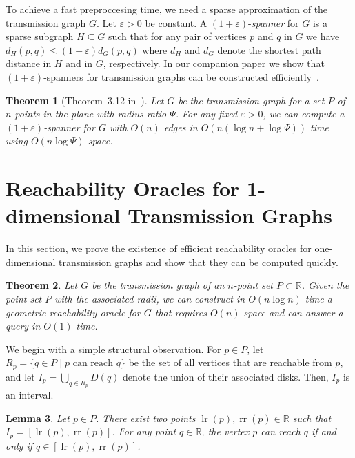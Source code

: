 \documentclass[11pt,a4paper]{paper}
\newtheorem{theorem}{Theorem}[section]
\newtheorem{lemma}[theorem]{Lemma}
\newcommand{\mathset}[1]{\ensuremath {\mathbb {#1}}}
\newcommand{\eps}{\ensuremath {\varepsilon}}
\newcommand{\R}{\mathset{R}}
\DeclareMathOperator{\lr}{lr}
\DeclareMathOperator{\rr}{rr}
\begin{document}
To achieve a fast preproccesing time, we need  a sparse approximation of
the transmission graph $G$. Let $\eps > 0$
be constant.
A $(1+\eps)$-\emph{spanner} for $G$ is a sparse subgraph $H \subseteq G$ such
that for any pair of vertices $p$ and $q$ in $G$ we have $d_H(p,q) \leq
(1+\eps) d_G(p,q)$ where $d_H$ and $d_G$ denote the shortest path distance in
$H$ and in $G$, respectively. In our
companion paper we show that $(1+\eps)$-spanners for transmission graphs can be
constructed efficiently~\cite{KaplanEtAl15}.
\begin{theorem}[Theorem~3.12 in~\cite{KaplanEtAl15}]
\label{thm:2dspanner}
  Let $G$ be the transmission graph for a set $P$ of
  $n$ points in the plane
  with radius ratio $\Psi$. For any fixed $\eps > 0$,
  we can compute
  a $(1+\eps)$-spanner for $G$ with $O(n)$ edges in $O(n(\log n + \log \Psi))$ time
  using  $O(n \log \Psi)$ space.
\end{theorem}

\section{Reachability Oracles for 1-dimensional Transmission Graphs}
\label{sec:1d}
In this section, we prove the existence of efficient reachability
oracles for one-dimensional transmission graphs and show that they
can be computed quickly.
\begin{theorem}
\label{thm:1doracle}
Let $G$ be the transmission graph of an $n$-point set $P \subset \R$.
Given the point set $P$ with the associated radii,
we can construct in $O(n \log n)$ time a geometric reachability oracle for
$G$ that requires  $O(n)$ space and can answer a query in  $O(1)$ time.
\end{theorem}

We begin with a simple structural observation. 
For $p \in P$, let $R_p = \{q \in P \mid p \text{ can reach } q\}$
be the set of all vertices that are reachable from $p$,
and let $I_p = \bigcup_{q \in R_p} D(q)$ denote the
union of their associated disks. Then, $I_p$ is an interval.

\begin{lemma}\label{obs:reachIB}
Let $p \in P$. There exist two points $\lr(p), \rr(p) \in \R$ such
that $I_p = [\lr(p), \rr(p)]$.
For any point $q \in \R$, the vertex $p$ can reach $q$ if and only if
$q \in [\lr(p),\rr(p)]$.
\end{lemma}
\end{document}
